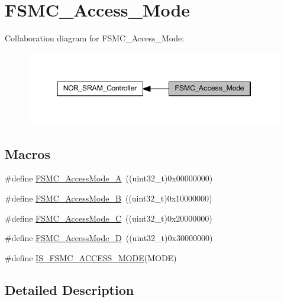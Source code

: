 \hypertarget{group___f_s_m_c___access___mode}{}\section{F\+S\+M\+C\+\_\+\+Access\+\_\+\+Mode}
\label{group___f_s_m_c___access___mode}
Collaboration diagram for F\+S\+M\+C\+\_\+\+Access\+\_\+\+Mode\+:
\nopagebreak
\begin{figure}[H]
\begin{center}
\leavevmode
\includegraphics[width=346pt]{group___f_s_m_c___access___mode}
\end{center}
\end{figure}
\subsection*{Macros}
\begin{DoxyCompactItemize}
\item 
\#define \hyperlink{group___f_s_m_c___access___mode_gae0f299b51c12257311694c4a8f5c00c3}{F\+S\+M\+C\+\_\+\+Access\+Mode\+\_\+A}~((uint32\+\_\+t)0x00000000)
\item 
\#define \hyperlink{group___f_s_m_c___access___mode_ga2d6ce7481eb5e0e86fda727c646e4109}{F\+S\+M\+C\+\_\+\+Access\+Mode\+\_\+B}~((uint32\+\_\+t)0x10000000)
\item 
\#define \hyperlink{group___f_s_m_c___access___mode_ga83ffa035cf2e95c957b67a2e8b879e86}{F\+S\+M\+C\+\_\+\+Access\+Mode\+\_\+C}~((uint32\+\_\+t)0x20000000)
\item 
\#define \hyperlink{group___f_s_m_c___access___mode_ga7c632e7ebeb0c0ab4919bb60b8714c7b}{F\+S\+M\+C\+\_\+\+Access\+Mode\+\_\+D}~((uint32\+\_\+t)0x30000000)
\item 
\#define \hyperlink{group___f_s_m_c___access___mode_ga1844335f297ea30e9d7fae09ce562092}{I\+S\+\_\+\+F\+S\+M\+C\+\_\+\+A\+C\+C\+E\+S\+S\+\_\+\+M\+O\+DE}(M\+O\+DE)
\end{DoxyCompactItemize}


\subsection{Detailed Description}


